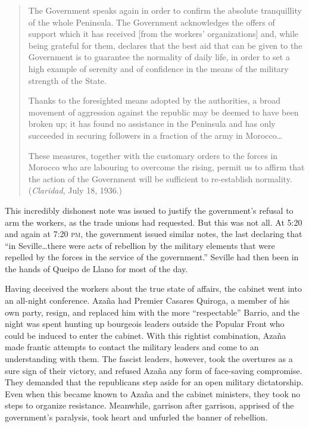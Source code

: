 \begin{quotation}
  The Government speaks again in order to confirm the absolute tranquillity of the whole Peninsula. The Government acknowledges the offers of support which it has received [from the workers’ organizations] and, while being grateful for them, declares that the best aid that can be given to the Government is to guarantee the normality of daily life, in order to set a high example of serenity and of confidence in the means of the military strength of the State.
  
  Thanks to the foresighted means adopted by the authorities, a broad movement of aggression against the republic may be deemed to have been broken up; it has found no assistance in the Peninsula and has only succeeded in securing followers in a fraction of the army in Morocco\ldots
  
  These measures, together with the customary orders to the forces in Morocco who are labouring to overcome the rising, permit us to affirm that the action of the Government will be sufficient to re-establish normality. (\emph{Claridad}, July 18, 1936.)
\end{quotation}

This incredibly dishonest note was issued to justify the government’s refusal to arm the workers, as the trade unions had requested. But this was not all. At 5:20 and again at 7:20 \textsc{pm}, the government issued similar notes, the last declaring that ``in Seville\ldots there were acts of rebellion by the military elements that were repelled by the forces in the service of the government.'' Seville had then been in the hands of Queipo de Llano for most of the day.

Having deceived the workers about the true state of affairs, the cabinet went into an all-night conference. Azaña had Premier Casares Quiroga, a member of his own party, resign, and replaced him with the more ``respectable'' Barrio, and the night was spent hunting up bourgeois leaders outside the Popular Front who could be induced to enter the cabinet. With this rightist combination, Azaña made frantic attempts to contact the military leaders and come to an understanding with them. The fascist leaders, however, took the overtures as a sure sign of their victory, and refused Azaña any form of face-saving compromise. They demanded that the republicans step aside for an open military dictatorship. Even when this became known to Azaña and the cabinet ministers, they took no steps to organize resistance. Meanwhile, garrison after garrison, apprised of the government’s paralysis, took heart and unfurled the banner of rebellion.

